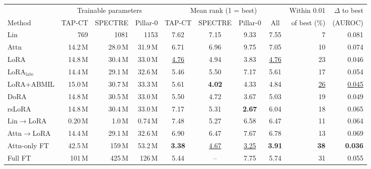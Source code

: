 \begin{tabular}{lrrrccccrr}
\toprule
 & \multicolumn{3}{c}{Trainable parameters} & \multicolumn{4}{c}{Mean rank (1 = best)} & Within 0.01 & $\Delta$ to best \\
\cmidrule(lr){2-4}\cmidrule(lr){5-8}
Method & TAP-CT & SPECTRE & Pillar-0 & TAP-CT & SPECTRE & Pillar-0 & All & of best (\%) & (AUROC) \\
\midrule
Lin & 769 & 1081 & 1153 & 7.62 & 7.15 & 9.33 & 7.55 & 7 & 0.081 \\
Attn & 14.2\,M & 28.0\,M & 31.9\,M & 6.71 & 6.96 & 9.75 & 7.05 & 10 & 0.074 \\
LoRA & 14.8\,M & 30.4\,M & 33.0\,M & \underline{4.76} & 4.94 & 3.83 & \underline{4.76} & 23 & 0.046 \\
LoRA$_{\text{late}}$ & 14.4\,M & 29.1\,M & 32.6\,M & 5.46 & 5.50 & 7.17 & 5.61 & 17 & 0.054 \\
LoRA+ABMIL & 15.0\,M & 30.7\,M & 33.3\,M & 5.61 & \textbf{4.02} & 4.33 & 4.84 & \underline{26} & \underline{0.045} \\
DoRA & 14.8\,M & 30.5\,M & 33.0\,M & 5.50 & 4.72 & 3.67 & 5.03 & 19 & 0.049 \\
rsLoRA & 14.8\,M & 30.4\,M & 33.0\,M & 7.17 & 5.31 & \textbf{2.67} & 6.04 & 18 & 0.065 \\
Lin$\to$LoRA & 0.20\,M & 1.0\,M & 0.74\,M & 7.48 & 5.27 & 6.58 & 6.47 & 11 & 0.064 \\
Attn$\to$LoRA & 14.4\,M & 29.1\,M & 32.6\,M & 6.90 & 6.47 & 7.67 & 6.78 & 13 & 0.069 \\
Attn-only FT & 42.5\,M & 159\,M & 53.2\,M & \textbf{3.38} & \underline{4.67} & \underline{3.25} & \textbf{3.91} & \textbf{38} & \textbf{0.036} \\
Full FT & 101\,M & 425\,M & 126\,M & 5.44 & -- & 7.75 & 5.74 & 31 & 0.055 \\
\bottomrule
\end{tabular}
